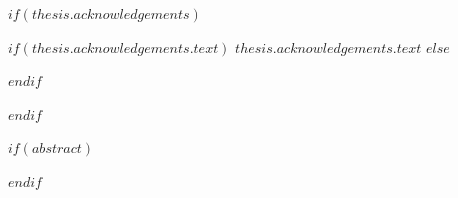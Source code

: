 \endgroup

$if(thesis.acknowledgements)$

\begin{acknowledgements}
\addchaptertocentry{\acknowledgementname} %
$if(thesis.acknowledgements.text)$
$thesis.acknowledgements.text$
$else$

$endif$
\end{acknowledgements}

$endif$

$if(abstract)$

\begin{abstract}
\addchaptertocentry{\abstractname} %
\end{abstract}

$endif$

\iraggedright %


% 



% 



% 



